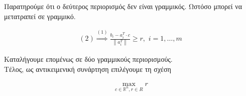 \documentclass[12pt]{article}
\newcommand{\R}{\mathbb{R}}
\newcommand{\centered}[1]{\begin{align*}#1\end{align*}}
\newcommand{\margin}{\hspace{4pt}}
\newcommand{\norm}[1]{\left\lVert#1\right\rVert}
\begin{document}
Παρατηρούμε ότι ο δεύτερος περιορισμός δεν είναι γραμμικός.
Ωστόσο μπορεί να μετατραπεί σε γραμμικό.

\centered{(2)\stackrel{(1)}{\Rightarrow}\frac{b_i - a^{T}_{i} \cdot c}{\norm{a^{T}_{i}}} \geq r, \margin i = 1, \dotsc, m}

Καταλήγουμε επομένως σε δύο γραμμικούς περιορισμούς. \\

Τέλος, ως αντικειμενική συνάρτηση επιλέγουμε τη σχέση

\centered{\max_{c \in \R^n, r \in R} r}

\vspace{2in}

\pagebreak
\end{document}
